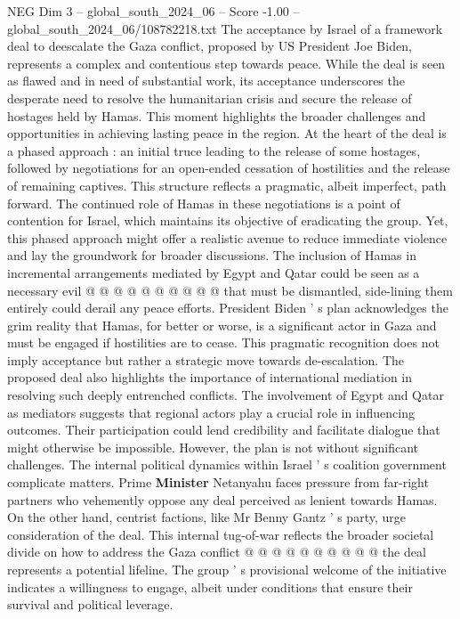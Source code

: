 \begin{textsample}{NEG Dim 3 – global\_south\_2024\_06 – Score -1.00 – global\_south\_2024\_06/108782218.txt}  \label{ex:f3_neg_118}
The acceptance by Israel of a framework deal to deescalate the Gaza conflict, proposed by US President Joe Biden, represents a complex and contentious step towards peace.
While the deal is seen as flawed and in need of substantial work, its acceptance underscores the desperate need to resolve the humanitarian crisis and secure the release of hostages held by Hamas.
This moment highlights the broader challenges and opportunities in achieving lasting peace in the region.
At the heart of the deal is a phased approach : an initial truce leading to the release of some hostages, followed by negotiations for an open-ended cessation of hostilities and the release of remaining captives.
This structure reflects a pragmatic, albeit imperfect, path forward.
The continued role of Hamas in these negotiations is a point of contention for Israel, which maintains its objective of eradicating the group.
Yet, this phased approach might offer a realistic avenue to reduce immediate violence and lay the groundwork for broader discussions.
The inclusion of Hamas in incremental arrangements mediated by Egypt and Qatar could be seen as a necessary evil @ @ @ @ @ @ @ @ @ @ that must be dismantled, side-lining them entirely could derail any peace efforts.
President Biden ' s plan acknowledges the grim reality that Hamas, for better or worse, is a significant actor in Gaza and must be engaged if hostilities are to cease.
This pragmatic recognition does not imply acceptance but rather a strategic move towards de-escalation.
The proposed deal also highlights the importance of international mediation in resolving such deeply entrenched conflicts.
The involvement of Egypt and Qatar as mediators suggests that regional actors play a crucial role in influencing outcomes.
Their participation could lend credibility and facilitate dialogue that might otherwise be impossible.
However, the plan is not without significant challenges.
The internal political dynamics within Israel ' s coalition government complicate matters.
Prime \textbf{Minister} Netanyahu faces pressure from far-right partners who vehemently oppose any deal perceived as lenient towards Hamas.
On the other hand, centrist factions, like Mr Benny Gantz ' s party, urge consideration of the deal.
This internal tug-of-war reflects the broader societal divide on how to address the Gaza conflict @ @ @ @ @ @ @ @ @ @ the deal represents a potential lifeline.
The group ' s provisional welcome of the initiative indicates a willingness to engage, albeit under conditions that ensure their survival and political leverage.

\end{textsample}
